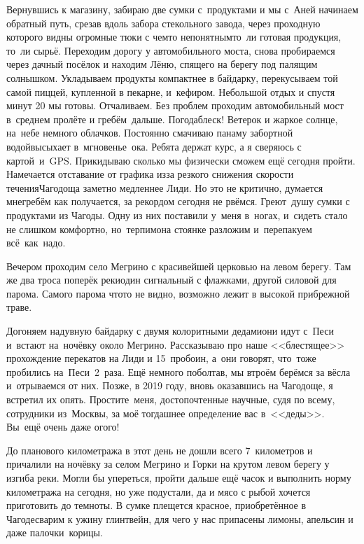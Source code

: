 Вернувшись к магазину, забираю две сумки с~продуктами и мы с~Аней начинаем обратный путь, срезав вдоль забора стекольного завода, через проходную которого видны огромные тюки с чем\sdash то непонятным\mdash то~ли готовая продукция, то~ли сырьё. Переходим дорогу у автомобильного моста, снова пробираемся через дачный посёлок и находим Лёню, спящего на берегу под палящим солнышком. Укладываем продукты компактнее в байдарку, перекусываем той самой пиццей, купленной в пекарне, и~кефиром. Небольшой отдых и спустя минут 20 мы готовы. Отчаливаем. Без проблем проходим автомобильный мост в~среднем пролёте и гребём~дальше. Погода\mdash блеск! Ветерок и жаркое солнце, на~небе немного облачков. 
\newpage
Постоянно смачиваю панаму забортной водой\mdash высыхает в~мгновенье~ока. Ребята держат курс, а я сверяюсь с картой~и~GPS. Прикидываю сколько мы физически сможем ещё сегодня пройти. Намечается отставание от графика из\sdash за резкого снижения скорости течения\mdash Чагодоща заметно медленнее Лиди. Но это не критично, думается мне\mdash гребём как получается, за рекордом сегодня не рвёмся. Греют~душу сумки с продуктами из Чагоды. Одну из них поставили у~меня в~ногах, и~сидеть стало не слишком комфортно, но~терпимо\mdash на стоянке разложим и~перепакуем всё~как~надо. 

Вечером проходим село Мегрино с красивейшей церковью на левом берегу. Там же два троса поперёк реки\mdash один сигнальный с флажками, другой силовой для парома. Самого парома что\sdash то не видно, возможно лежит в высокой прибрежной траве. 

Догоняем надувную байдарку с двумя колоритными дедами\mdash они идут с~Песи и~встают на~ночёвку около Мегрино. Рассказываю про наше <<блестящее>> прохождение перекатов на Лиди и 15~пробоин, а~они говорят, что~тоже пробились на~Песи~2~раза. Ещё немного поболтав, мы втроём берёмся за вёсла и~отрываемся от них. Позже, в 2019 году, вновь оказавшись на Чагодоще, я встретил их опять. Простите~меня, достопочтенные научные, судя по всему, сотрудники из~Москвы, за моё тогдашнее определение вас в~<<деды>>. Вы~ещё очень даже ого\sdash го!

До планового километража в этот день не дошли всего 7~километров и причалили на ночёвку за селом Мегрино и Горки на крутом левом берегу у изгиба реки. Могли бы упереться, пройти дальше ещё часок и выполнить норму километража на сегодня, но уже подустали, да и мясо с рыбой хочется приготовить до темноты. В сумке плещется красное, приобретённое в Чагоде\mdash сварим к ужину глинтвейн, для чего у нас припасены лимоны, апельсин и даже палочки~корицы. 

